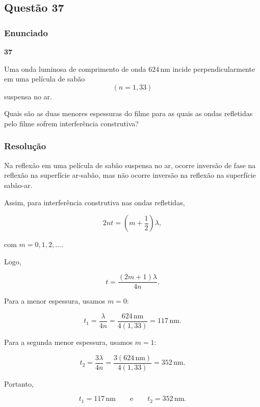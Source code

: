\subsection{Questão 37}

\subsubsection{Enunciado}

\textbf{37}

Uma onda luminosa de comprimento de onda \(624\,\text{nm}\) incide perpendicularmente em uma película de sabão
\[
(n = 1{,}33)
\]
suspensa no ar.

Quais são as duas menores espessuras do filme para as quais as ondas refletidas pelo filme sofrem interferência construtiva?

\vspace{0.5cm}

\subsubsection{Resolução}

Na reflexão em uma película de sabão suspensa no ar, ocorre inversão de fase na
reflexão na superfície ar-sabão, mas não ocorre inversão na reflexão na
superfície sabão-ar.

Assim, para interferência construtiva nas ondas refletidas,

\[
2nt=\left(m+\frac{1}{2}\right)\lambda,
\]

com \(m=0,1,2,\ldots\).

Logo,

\[
t=\frac{(2m+1)\lambda}{4n}.
\]

Para a menor espessura, usamos \(m=0\):

\[
t_1=\frac{\lambda}{4n}
=\frac{624\,\text{nm}}{4(1{,}33)}
=117\,\text{nm}.
\]

Para a segunda menor espessura, usamos \(m=1\):

\[
t_2=\frac{3\lambda}{4n}
=\frac{3(624\,\text{nm})}{4(1{,}33)}
=352\,\text{nm}.
\]

Portanto,

\[
\boxed{t_1=117\,\text{nm}}
\qquad \text{e} \qquad
\boxed{t_2=352\,\text{nm}}.
\]

\vspace{1cm}
